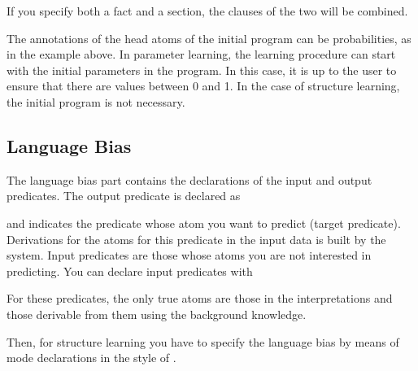 \documentclass[letterpaper,10pt,english]{sphinxmanual}
\begin{document}
\sphinxAtStartPar
If you specify both a  fact and a section, the clauses of the two will be combined.

\sphinxAtStartPar
The annotations of the head atoms of the initial program can be probabilities, as in the example above. In parameter learning, the learning procedure can start with the initial parameters in the program. In this case, it is up to the user to ensure that there are values between 0 and 1. In the case of structure learning, the initial program is not necessary.


\subsection{Language Bias}
\label{\detokenize{index:language-bias}}
\sphinxAtStartPar
The language bias part contains the declarations of the input and output predicates.
The output predicate is declared as

\begin{sphinxVerbatim}[commandchars=\\\{\}]
\end{sphinxVerbatim}

\sphinxAtStartPar
and indicates the predicate whose atom you want to predict (target predicate).
Derivations for the atoms for this predicate in the input data is built by the system.
Input predicates are those whose atoms you are not interested in predicting.
You can declare input predicates with

\begin{sphinxVerbatim}[commandchars=\\\{\}]
\end{sphinxVerbatim}

\sphinxAtStartPar
For these predicates, the only true atoms are those in the interpretations and those derivable from them using the background knowledge.

\sphinxAtStartPar
Then, for structure learning you have to specify the language bias by means of mode declarations in the style of .

\begin{sphinxVerbatim}[commandchars=\\\{\}]
\end{sphinxVerbatim}
\end{document}
